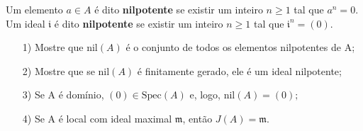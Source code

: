 \documentclass[algebraII_notes.tex]{subfiles}
\begin{document}
\begin{def*}
	Um elemento \(a\in A\) é dito \textbf{nilpotente} se existir um inteiro \(n\geq 1\) tal que \(a^{n} = 0.\) Um ideal
	\(\mathfrak{i}\) é dito \textbf{nilpotente} se existir um inteiro \(n\geq 1\) tal que \(\mathfrak{i}^{n} = (0).\)
\end{def*}
\begin{prop*}[Exercício]
	\begin{itemize}
		\item[1)] Mostre que \(\mathrm{nil}(A)\) é o conjunto de todos os elementos nilpotentes de A;
		\item[2)] Mostre que se \(\mathrm{nil}(A)\) é finitamente gerado, ele é um ideal nilpotente;
		\item[3)] Se A é domínio, \((0)\in \mathrm{Spec}(A)\) e, logo, \(\mathrm{nil}(A) = (0);\)
		\item[4)] Se A é local com ideal maximal \(\mathfrak{m}\), então \(J(A) = \mathfrak{m}.\)
	\end{itemize}
\end{prop*}
\end{document}
